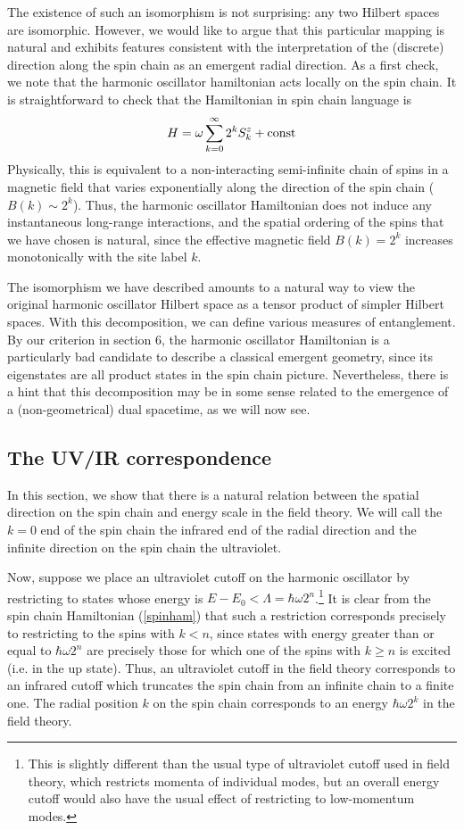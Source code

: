 \documentclass[12pt,epsf]{article}
\renewcommand{\(}{\left(}
\renewcommand{\)}{\right)}
\begin{document}
The existence of such an isomorphism is not surprising: any two Hilbert spaces are isomorphic. However, we would like to argue that this particular mapping is natural and exhibits features consistent with the interpretation of the (discrete) direction along the spin chain as an emergent radial direction. As a first check, we note that the harmonic oscillator hamiltonian acts locally on the spin chain. It is straightforward to check that the Hamiltonian in spin chain language is
\begin{equation}
\label{spinham}
H = \omega \sum_{k=0}^\infty 2^k S^z_k + {\rm const}
\end{equation}
Physically, this is equivalent to a non-interacting semi-infinite chain of spins in a magnetic field that varies exponentially along the direction of the spin chain ($B(k) \sim 2^k$). Thus, the harmonic oscillator Hamiltonian does not induce any instantaneous long-range interactions, and the spatial ordering of the spins that we have chosen is natural, since the effective magnetic field $B(k) = 2^k$ increases monotonically with the site label $k$.

The isomorphism we have described amounts to a natural way to view the original harmonic oscillator Hilbert space as a tensor product of simpler Hilbert spaces. With this decomposition, we can define various measures of entanglement. By our criterion in section 6, the harmonic oscillator Hamiltonian is a particularly bad candidate to describe a classical emergent geometry, since its eigenstates are all product states in the spin chain picture. Nevertheless, there is a hint that this decomposition may be in some sense related to the emergence of a (non-geometrical) dual spacetime, as we will now see.

\subsection{The UV/IR correspondence}

In this section, we show that there is a natural relation between the spatial direction on the spin chain and energy scale in the field theory. We will call the $k=0$ end of the spin chain the infrared end of the radial direction and the infinite direction on the spin chain the ultraviolet.

Now, suppose we place an ultraviolet cutoff on the harmonic oscillator by restricting to states whose energy is $E - E_0 < \Lambda = \hbar \omega 2^n$.\footnote{This is slightly different than the usual type of ultraviolet cutoff used in field theory, which restricts momenta of individual modes, but an overall energy cutoff would also have the usual effect of restricting to low-momentum modes.} It is clear from the spin chain Hamiltonian (\ref{spinham}) that such a restriction corresponds precisely to restricting to the spins with $k<n$, since states with energy greater than or equal to $\hbar \omega 2^n$ are precisely those for which one of the spins with $k \ge n$ is excited (i.e. in the up state). Thus, an ultraviolet cutoff in the field theory corresponds to an infrared cutoff which truncates the spin chain from an infinite chain to a finite one. The radial position $k$ on the spin chain corresponds to an energy $\hbar \omega 2^k$ in the field theory.
\end{document}
